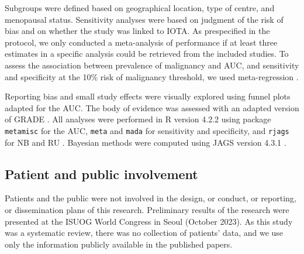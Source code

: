 Subgroups were defined based on geographical location, type of centre, and menopausal status. Sensitivity analyses were based on judgment of the risk of bias and on whether the study was linked to IOTA. As prespecified in the protocol, we only conducted a meta-analysis of performance if at least three estimates in a specific analysis could be retrieved from the included studies. To assess the association between prevalence of malignancy and AUC, and sensitivity and specificity at the 10\% risk of malignancy threshold, we used meta-regression \cite{thompsonHowShouldMetaregression2002}.

Reporting bias and small study effects were visually explored using funnel plots
adapted for the \gls{AUC}. The body of evidence was assessed with an adapted version
of \gls{GRADE} \cite{guyattGRADEEmergingConsensus2008}. All analyses were performed in
R version 4.2.2 using package \texttt{metamisc} for the \gls{AUC}, \texttt{meta} and \texttt{mada} for
sensitivity and specificity, and \texttt{rjags} for \gls{NB} and \gls{RU}
 \cite{debrayFrameworkMetaanalysisPrediction2019,
schwarzerMetaAnalysis2015,
doeblerMetaanalysisDiagnosticAccuracy2025,
plummerRjagsBayesianGraphical2023}.
Bayesian methods were computed using \gls{JAGS} version 4.3.1
 \cite{plummerRjagsBayesianGraphical2023}.

\subsection{Patient and public involvement}
Patients and the public were not involved in the design, or conduct, or reporting, or dissemination plans of this research. Preliminary results of the research were presented at the ISUOG World Congress in Seoul (October 2023). As this study was a systematic review, there was no collection of patients' data, and we use only the information publicly available in the published papers.

